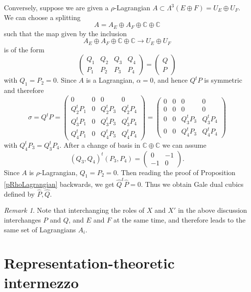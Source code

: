 \documentclass[11pt]{amsart}
\theoremstyle{plain}
\numberwithin{equation}{section}
\theoremstyle{definition}
\theoremstyle{remark}
\newtheorem{remark}[theorem]{Remark}
\newcommand{\C}{\mathbb C}
\begin{document}
Conversely, suppose we are given a $\rho$-Lagrangian $A \subset \Lambda^3 (E\oplus F) = U_E \oplus U_F$. We can choose a splitting
\[
A = A_E \oplus A_F \oplus \mathbb{C} \oplus \mathbb{C}
\]
such that the map given by the inclusion
\[
A_E \oplus A_F \oplus \mathbb{C} \oplus \mathbb{C} \to U_E \oplus U_F
\]
is of the form 
\[
\begin{pmatrix}
Q_1 & Q_2 & Q_3 & Q_4 \\
P_1 & P_2 & P_3 & P_4 
\end{pmatrix} = \begin{pmatrix} Q \\ P \end{pmatrix}
\]
with $Q_1=P_2=0$. 
Since $A$ is a Lagrangian, $\alpha =0$, and hence $Q^tP$ is symmetric and therefore 
\[
\sigma= 
Q^tP = \begin{pmatrix}
 0 & 0 & 0 & 0 \\
 Q^t_2P_1 & 0 & Q_2^t P_3 & Q_2^t P_4 \\
  Q^t_3P_1 & 0 & Q_3^t P_3 & Q_3^t P_4 \\
   Q^t_4P_1 & 0 & Q_4^t P_3 & Q_4^t P_4 
\end{pmatrix} =
\begin{pmatrix}
0 & 0 & 0 & 0\\
0 & 0 & 0 & 0\\
0 & 0 &  Q_3^t P_3 & Q_3^t P_4\\
0 & 0 & Q_4^t P_3 & Q_4^t P_4 
\end{pmatrix}
\]
with $Q_4^tP_3 = Q_3^tP_4$. After a change of basis in $\C \oplus \C$ we can assume 
\[
	(Q_3,Q_4)^t (P_3,P_4) = \begin{pmatrix} 0 & -1 \\ -1 & 0 \end{pmatrix}. 
\]
Since $A$ is $\rho$-Lagrangian, $Q_1=P_2=0$. Then reading the proof of Proposition \ref{pRhoLagrangian} backwards, we get $\widehat{Q}^t\widehat{P}=0$. Thus we obtain Gale dual cubics defined by $\widehat{P}, \widehat{Q}$. 

\begin{remark}\label{rSameLagrangians}
Note that interchanging the roles of $X$ and $X'$ in the above discussion interchanges $P$ and $Q$, and $E$ and $F$ at the same time, and therefore leads to the same set of Lagrangians $A_i$. 
\end{remark}


\section{Representation-theoretic intermezzo}\label{sRepTheory}
\end{document}
